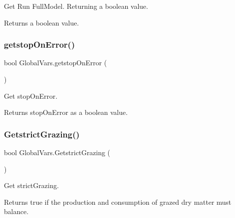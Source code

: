 Get Run Full\+Model. Returning a boolean value. 

\begin{DoxyReturn}{Returns}
a boolean value. 
\end{DoxyReturn}
\mbox{\label{class_global_vars_af818a48cc2a3646bfdf81ce83d256c75}} 
\subsubsection{\texorpdfstring{getstopOnError()}{getstopOnError()}}
{\footnotesize\ttfamily bool Global\+Vars.\+getstop\+On\+Error (\begin{DoxyParamCaption}{ }\end{DoxyParamCaption})\hspace{0.3cm}{\ttfamily [inline]}}



Get stop\+On\+Error. 

\begin{DoxyReturn}{Returns}
stop\+On\+Error as a boolean value. 
\end{DoxyReturn}
\mbox{\label{class_global_vars_a0fc8e12399cf9407f2d87a416491f97f}} 
\subsubsection{\texorpdfstring{GetstrictGrazing()}{GetstrictGrazing()}}
{\footnotesize\ttfamily bool Global\+Vars.\+Getstrict\+Grazing (\begin{DoxyParamCaption}{ }\end{DoxyParamCaption})\hspace{0.3cm}{\ttfamily [inline]}}



Get strict\+Grazing. 

\begin{DoxyReturn}{Returns}
true if the production and consumption of grazed dry matter must balance. 
\end{DoxyReturn}
\mbox{\label{class_global_vars_ae46e7193670046608e26f2342ce6287d}} 
